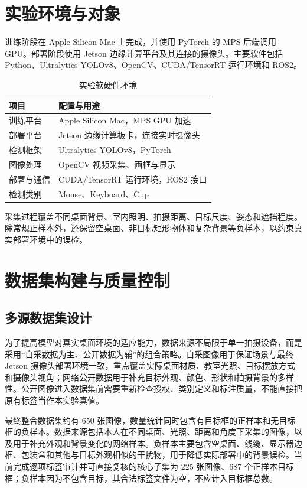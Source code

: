 \documentclass[UTF8,fontset=none,a4paper,11pt]{ctexart}
\begin{document}
\section{实验环境与对象}
训练阶段在 Apple Silicon Mac 上完成，并使用 PyTorch 的 MPS 后端调用 GPU。部署阶段使用 Jetson 边缘计算平台及其连接的摄像头。主要软件包括 Python、Ultralytics YOLOv8、OpenCV、CUDA/TensorRT 运行环境和 ROS2。
\begin{table}[htbp]\centering\caption{实验软硬件环境}\label{tab:environment}
{\renewcommand{\arraystretch}{1.28}\begin{tabular}{>{\raggedright\arraybackslash}m{3.4cm}>{\raggedright\arraybackslash}m{10.2cm}}\toprule
\textbf{项目} & \textbf{配置与用途}\\\midrule
训练平台 & Apple Silicon Mac，MPS GPU 加速\\
部署平台 & Jetson 边缘计算板卡，连接实时摄像头\\
检测框架 & Ultralytics YOLOv8，PyTorch\\
图像处理 & OpenCV 视频采集、画框与显示\\
部署与通信 & CUDA/TensorRT 运行环境，ROS2 接口\\
检测类别 & Mouse、Keyboard、Cup\\\bottomrule
\end{tabular}}\end{table}
采集过程覆盖不同桌面背景、室内照明、拍摄距离、目标尺度、姿态和遮挡程度。除常规正样本外，还保留空桌面、非目标矩形物体和复杂背景等负样本，以约束真实部署环境中的误检。

\section{数据集构建与质量控制}
\subsection{多源数据集设计}
为了提高模型对真实桌面环境的适应能力，数据来源不局限于单一拍摄设备，而是采用“自采数据为主、公开数据为辅”的组合策略。自采图像用于保证场景与最终 Jetson 摄像头部署环境一致，重点覆盖实际桌面材质、教室光照、目标摆放方式和摄像头视角；网络公开数据用于补充目标外观、颜色、形状和拍摄背景的多样性。公开图像进入数据集前需要重新检查授权、类别定义和标注质量，不能直接把原有标签当作本实验真值。

最终整合数据集约有 650 张图像，数量统计同时包含有目标框的正样本和无目标框的负样本。数据来源包括本人在不同桌面、光照、距离和角度下采集的图像，以及用于补充外观和背景变化的网络样本。负样本主要包含空桌面、线缆、显示器边框、包装盒和其他与目标外观相似的干扰物，用于降低实际部署中的背景误检。当前完成逐项标签审计并可直接复核的核心子集为 225 张图像、687 个正样本目标框；负样本因为不包含目标，其合法标签文件为空，不应计入目标框总数。
\end{document}

